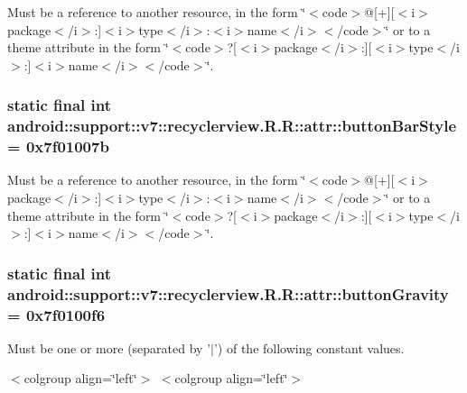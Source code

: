 Must be a reference to another resource, in the form \char`\"{}$<$code$>$@\mbox{[}+\mbox{]}\mbox{[}$<$i$>$package$<$/i$>$:\mbox{]}$<$i$>$type$<$/i$>$:$<$i$>$name$<$/i$>$$<$/code$>$\char`\"{} or to a theme attribute in the form \char`\"{}$<$code$>$?\mbox{[}$<$i$>$package$<$/i$>$:\mbox{]}\mbox{[}$<$i$>$type$<$/i$>$:\mbox{]}$<$i$>$name$<$/i$>$$<$/code$>$\char`\"{}. \hypertarget{classandroid_1_1support_1_1v7_1_1recyclerview_1_1_r_1_1attr_3ac0a038c4f5904a666e444dd191c9b7}{
\subsubsection[{buttonBarStyle}]{\setlength{\rightskip}{0pt plus 5cm}static final int android::support::v7::recyclerview.R.R::attr::buttonBarStyle = 0x7f01007b}}
\label{classandroid_1_1support_1_1v7_1_1recyclerview_1_1_r_1_1attr_3ac0a038c4f5904a666e444dd191c9b7}


Must be a reference to another resource, in the form \char`\"{}$<$code$>$@\mbox{[}+\mbox{]}\mbox{[}$<$i$>$package$<$/i$>$:\mbox{]}$<$i$>$type$<$/i$>$:$<$i$>$name$<$/i$>$$<$/code$>$\char`\"{} or to a theme attribute in the form \char`\"{}$<$code$>$?\mbox{[}$<$i$>$package$<$/i$>$:\mbox{]}\mbox{[}$<$i$>$type$<$/i$>$:\mbox{]}$<$i$>$name$<$/i$>$$<$/code$>$\char`\"{}. \hypertarget{classandroid_1_1support_1_1v7_1_1recyclerview_1_1_r_1_1attr_ed7410813c5e6703bec9b48e516e9e26}{
\subsubsection[{buttonGravity}]{\setlength{\rightskip}{0pt plus 5cm}static final int android::support::v7::recyclerview.R.R::attr::buttonGravity = 0x7f0100f6}}
\label{classandroid_1_1support_1_1v7_1_1recyclerview_1_1_r_1_1attr_ed7410813c5e6703bec9b48e516e9e26}


Must be one or more (separated by '$|$') of the following constant values. \begin{TabularC}{0}
\hline
\end{TabularC}
$<$colgroup align=\char`\"{}left\char`\"{}$>$ $<$colgroup align=\char`\"{}left\char`\"{}$>$ 

